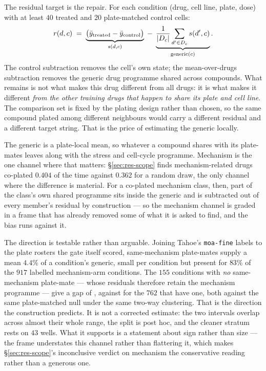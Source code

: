 The residual target is the repair. For each condition (drug, cell line, plate, dose) with at least
$40$ treated and $20$ plate-matched control cells:
\begin{equation}
 r(d,c) \;=\; \underbrace{\big(\bar{y}_{\textrm{treated}} - \bar{y}_{\textrm{control}}\big)}_{s(d,c)}
 \;-\; \underbrace{\frac{1}{|D_c|}\sum_{d' \in D_c} s(d',c)}_{\textrm{generic}(c)} .
\end{equation}
The control subtraction removes the cell's own state; the mean-over-drugs subtraction removes the
generic drug programme shared across compounds. What remains is not what makes this drug different
from all drugs: it is what makes it different \emph{from the other training drugs that happen to
share its plate and cell line}. The comparison set is fixed by the plating design rather than
chosen, so the same compound plated among different neighbours would carry a different residual and
a different target string. That is the price of estimating the generic locally.

The generic is a plate-local mean, so whatever a compound shares with its plate-mates leaves along
with the stress and cell-cycle programme. Mechanism is the one channel where that matters:
\S\ref{sec:res-scope} finds mechanism-related drugs co-plated $0.404$ of the time against $0.362$
for a random draw, the only channel where the difference is material. For a co-plated mechanism
class, then, part of the class's own shared programme sits inside the generic and is subtracted out
of every member's residual by construction --- so the mechanism channel is graded in a frame that
has already removed some of what it is asked to find, and the bias runs against it.

The direction is testable rather than arguable. Joining Tahoe's \texttt{moa-fine} labels to the
plate rosters the gate itself scored, same-mechanism plate-mates supply a mean $4.4\%$ of a
condition's generic, small per condition but present for $83\%$ of the $917$ labelled
mechanism-arm conditions. The $155$ conditions with \emph{no} same-mechanism plate-mate --- whose
residuals therefore retain the mechanism programme --- give a gap of
, against  for the $762$ that have one,
both against the same plate-matched null under the same two-way clustering. That is the direction
the construction predicts. It is not a corrected estimate: the two intervals overlap across almost
their whole range, the split is post hoc, and the cleaner stratum rests on $43$ wells. What it
supports is a statement about sign rather than size --- the frame understates this channel rather
than flattering it, which makes \S\ref{sec:res-scope}'s inconclusive verdict on mechanism the
conservative reading rather than a generous one.


